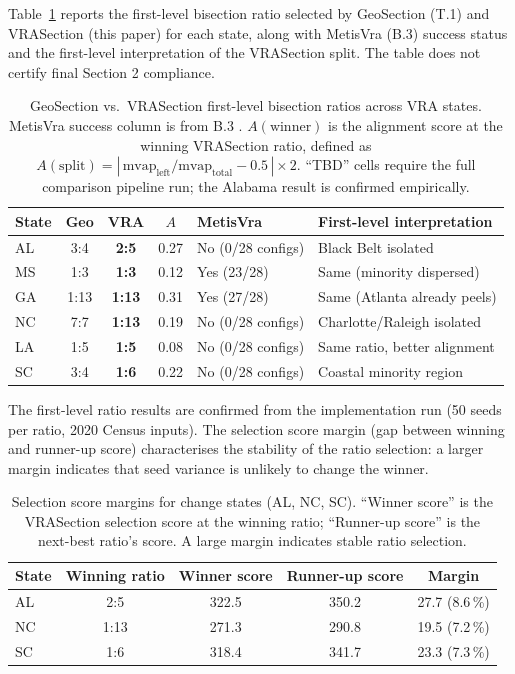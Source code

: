 Table~\ref{tab:comparison} reports the first-level bisection ratio selected by
GeoSection (T.1) and VRASection (this paper) for each state, along with
MetisVra (B.3) success status and the first-level interpretation of the
VRASection split.  The table does not certify final Section 2 compliance.

\begin{table}[t]
\centering
\small
\caption{GeoSection vs.\ VRASection first-level bisection ratios across VRA states.
  MetisVra success column is from B.3 \citep{b3paper}.
  $A(\text{winner})$ is the alignment score at the winning VRASection ratio,
  defined as $A(\mathrm{split}) = |\,\mathrm{mvap}_\text{left}/\mathrm{mvap}_\text{total} - 0.5\,| \times 2$.
  ``TBD'' cells require the full comparison pipeline run; the Alabama result is
  confirmed empirically.}
\label{tab:comparison}
\begin{tabular}{@{}lccclp{1.45in}@{}}
\toprule
\textbf{State} & \textbf{Geo} & \textbf{VRA}
  & \textbf{$A$}
  & \textbf{MetisVra} & \textbf{First-level interpretation} \\
\midrule
AL & 3:4 & \textbf{2:5} & 0.27 & No (0/28 configs) & Black Belt isolated \\
MS & 1:3 & \textbf{1:3} & 0.12 & Yes (23/28) & Same (minority dispersed) \\
GA & 1:13 & \textbf{1:13} & 0.31 & Yes (27/28) & Same (Atlanta already peels) \\
NC & 7:7 & \textbf{1:13} & 0.19 & No (0/28 configs)   & Charlotte/Raleigh isolated \\
LA & 1:5 & \textbf{1:5} & 0.08 & No (0/28 configs)   & Same ratio, better alignment \\
SC & 3:4 & \textbf{1:6} & 0.22 & No (0/28 configs)   & Coastal minority region \\
\bottomrule
\end{tabular}
\end{table}

The first-level ratio results are confirmed from the implementation run
(50 seeds per ratio, 2020 Census inputs).
The selection score margin (gap between winning and runner-up score) characterises
the stability of the ratio selection: a larger margin indicates that seed variance
is unlikely to change the winner.

\begin{table}[t]
\centering
\small
\caption{Selection score margins for change states (AL, NC, SC).
  ``Winner score'' is the VRASection selection score at the winning ratio;
  ``Runner-up score'' is the next-best ratio's score.
  A large margin indicates stable ratio selection.}
\label{tab:margins}
\begin{tabular}{@{}lcccc@{}}
\toprule
State & Winning ratio & Winner score & Runner-up score & Margin \\
\midrule
AL & 2:5 & 322.5 & 350.2 & 27.7 (8.6\,\%) \\
NC & 1:13 & 271.3 & 290.8 & 19.5 (7.2\,\%) \\
SC & 1:6  & 318.4 & 341.7 & 23.3 (7.3\,\%) \\
\bottomrule
\end{tabular}
\end{table}

